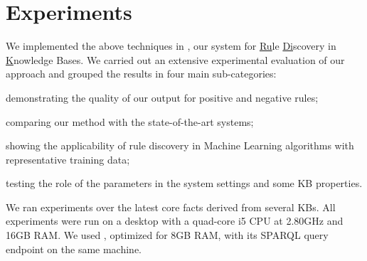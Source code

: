\section{Experiments} \label{sec:krd_experiments}
We implemented the above techniques in \krd, our system for \underline{Ru}le \underline{Di}scovery in \underline{K}nowledge Bases.
We carried out an extensive experimental evaluation of our approach and grouped the results in four main sub-categories: 
\begin{inparaenum}[\itshape(i)]
	\item demonstrating the quality of our output for positive and negative rules;
	\item comparing our method with the state-of-the-art systems;
	\item showing the applicability of rule discovery in Machine Learning algorithms with representative training data;
	\item testing the role of the parameters in the system settings and some KB properties.
\end{inparaenum}

We ran experiments over the latest core facts derived from several KBs. All experiments were run on a desktop with a quad-core i5 CPU at 2.80GHz and 16GB RAM. We used , optimized for 8GB RAM, with its SPARQL query endpoint on the same machine.


